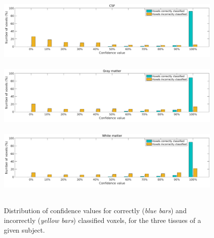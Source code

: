 \documentclass[twoside,espcrc2]{elsarticle}
\begin{document}
\begin{figure}[ht!]
     \begin{center}
     \mbox{
        \includegraphics[width=0.95\linewidth]{CSF_PDF_Bar2.png}
        }
     \mbox{
        \includegraphics[width=0.95\linewidth]{GM_PDF_Bar2.png}
        }
   \mbox{
        \includegraphics[width=0.95\linewidth]{WM_PDF_Bar2.png}
        }     
\caption{Distribution of confidence values for correctly (\textit{blue bars}) and incorrectly (\textit{yellow bars}) classified voxels, for the three tissues of a given subject.}
\label{fig:PDF_Condifence}
\end{center}
\end{figure}
\end{document}
